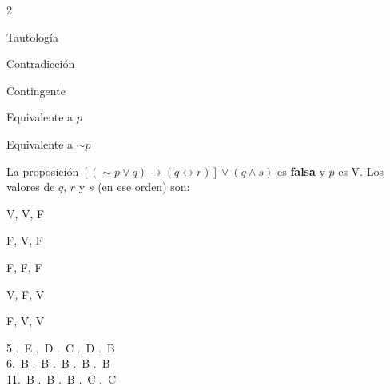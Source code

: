 \begin{multicols}{2}
		\begin{alternativas}
			\item Tautología
			\item Contradicción
			\item Contingente
			\item Equivalente a $p$
			\item Equivalente a $\sim p$
		\end{alternativas}
		\vspace{0.3cm}
		
		\ejercicio La proposición $[(\sim p \vee q) \to (q \leftrightarrow r)] \vee
		(q \wedge s)$ es \textbf{falsa} y $p$ es V. Los valores de $q$, $r$ y $s$
		(en ese orden) son:
		
		\begin{alternativas}
			\item V, V, F
			\item F, V, F
			\item F, F, F
			\item V, F, V
			\item F, V, V
		\end{alternativas}
		
	\end{multicols}
	
	\vspace{0.5cm}
	\begin{tcolorbox}[
		enhanced, colback=GrisClaro, colframe=GrisMedio,
		arc=2pt, boxrule=0.5pt,
		fonttitle=\sffamily\bfseries\small\color{GrisCarbón},
		title={Clave de Respuestas}
		]
		\small\sffamily
		\begin{multicols}{5}
			.~E .~D .~C .~D .~B \\
			6.~B .~B .~B .~B .~B \\
			11.~B .~B .~B .~C .~C
		\end{multicols}
	\end{tcolorbox}
	
